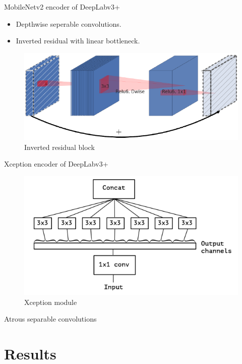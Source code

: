 \documentclass{beamer}
\begin{document}
\begin{frame}{MobileNetv2 encoder of DeepLabv3+}
	\begin{small}
	\begin{itemize}
		\item Depthwise seperable convolutions.
		\item Inverted residual with linear bottleneck.
	\end{itemize}
	\end{small}
	
	\begin{figure}
		\centering
		\includegraphics[width=.6\linewidth]{images/inverted_residual}
		\captionsetup{justification=centering,margin=0.2cm}
		\caption{Inverted residual block}
		\label{Fig:residual}
	\end{figure}

\end{frame}

\begin{frame}{Xception encoder of DeepLabv3+}

	\begin{figure}[h]
		\centering
		\includegraphics[width=0.5\linewidth]{images/extreme_inception}
		\captionsetup{justification=centering,margin=0.2cm}
		\caption{Xception module}
		\label{Fig:xception}
	\end{figure}

\end{frame}

\begin{frame}{Atrous separable convolutions}


\end{frame}

\section{Results}
\end{document}
